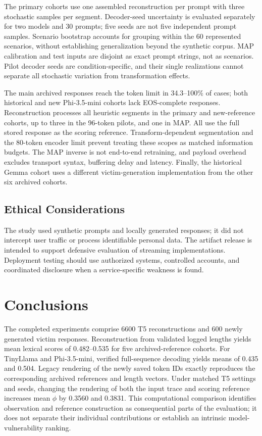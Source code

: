 \documentclass[electronics,article,submit,pdftex,moreauthors]{Definitions/mdpi}
\begin{document}
The primary cohorts use one assembled reconstruction per prompt with three stochastic samples per segment. Decoder-seed uncertainty is evaluated separately for two models and 30 prompts; five seeds are not five independent prompt samples. Scenario bootstrap accounts for grouping within the 60 represented scenarios, without establishing generalization beyond the synthetic corpus. MAP calibration and test inputs are disjoint as exact prompt strings, not as scenarios. Pilot decoder seeds are condition-specific, and their single realizations cannot separate all stochastic variation from transformation effects.

The main archived responses reach the token limit in 34.3--100\% of cases; both historical and new Phi-3.5-mini cohorts lack EOS-complete responses. Reconstruction processes all heuristic segments in the primary and new-reference cohorts, up to three in the 96-token pilots, and one in MAP. All use the full stored response as the scoring reference. Transform-dependent segmentation and the 80-token encoder limit prevent treating these scopes as matched information budgets. The MAP inverse is not end-to-end retraining, and payload overhead excludes transport syntax, buffering delay and latency. Finally, the historical Gemma cohort uses a different victim-generation implementation from the other six archived cohorts.

\subsection{Ethical Considerations}
The study used synthetic prompts and locally generated responses; it did not intercept user traffic or process identifiable personal data. The artifact release is intended to support defensive evaluation of streaming implementations. Deployment testing should use authorized systems, controlled accounts, and coordinated disclosure when a service-specific weakness is found.

\section{Conclusions}
The completed experiments comprise 6600 T5 reconstructions and 600 newly generated victim responses. Reconstruction from validated logged lengths yields mean lexical scores of 0.482--0.535 for five archived-reference cohorts. For TinyLlama and Phi-3.5-mini, verified full-sequence decoding yields means of 0.435 and 0.504. Legacy rendering of the newly saved token IDs exactly reproduces the corresponding archived references and length vectors. Under matched T5 settings and seeds, changing the rendering of both the input trace and scoring reference increases mean $\phi$ by 0.3560 and 0.3831. This computational comparison identifies observation and reference construction as consequential parts of the evaluation; it does not separate their individual contributions or establish an intrinsic model-vulnerability ranking.
\end{document}
